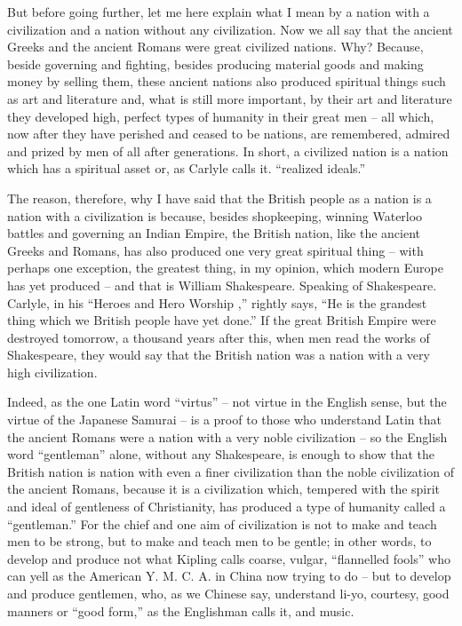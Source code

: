 But before going further, let me here explain what I mean by a nation with a civilization and a nation without any civilization.
Now we all say that the ancient Greeks and the ancient Romans were great civilized nations.
Why? Because, beside governing and fighting,
besides producing material goods and making money by selling them,
these ancient nations also produced spiritual things such as art and literature and,
what is still more important,
by their art and literature they developed high, perfect types of humanity in their great men
-- all which, now after they have perished and ceased to be nations,
are remembered, admired and prized by men of all after generations.
In short, a civilized nation is a nation which has a spiritual asset or,
as Carlyle calls it. ``realized ideals.'' 

The reason, therefore, why I have said that the British people as a nation is a nation with a civilization is because, besides shopkeeping, winning Waterloo battles and governing an Indian Empire, the British nation, like the ancient Greeks and Romans, has also produced one very great spiritual thing
-- with perhaps one exception, the greatest thing, in my opinion,
which modern Europe has yet produced
-- and that is William Shakespeare.
Speaking of Shakespeare. Carlyle,
in his ``Heroes and Hero Worship ,'' rightly says,
``He is the grandest thing which we British people have yet done.''
If the great British Empire were destroyed tomorrow, a thousand years after this, when men read the works of Shakespeare,
they would say that the British nation was a nation with a very high civilization.

Indeed, as the one Latin word ``virtus'' -- not virtue in the English sense, but the virtue of the Japanese Samurai -- is a proof to those who understand Latin that the ancient Romans were a nation with a very noble civilization
-- so the English word ``gentleman'' alone, without any Shakespeare, is enough to show that the British nation is nation with even a finer civilization than the noble civilization of the ancient Romans, because it is a civilization which, tempered with the spirit and ideal of gentleness of Christianity,
has produced a type of humanity called a ``gentleman.''
For the chief and one aim of civilization is not to make and teach men to be strong,
but to make and teach men to be gentle;
in other words, to develop and produce not what Kipling calls coarse, vulgar, ``flannelled fools'' who can yell as the American Y. M. C. A. in China now trying to do
-- but to develop and produce gentlemen,
who, as we Chinese say, understand li-yo, courtesy, good manners or ``good form,'' as the Englishman calls it, and music.

